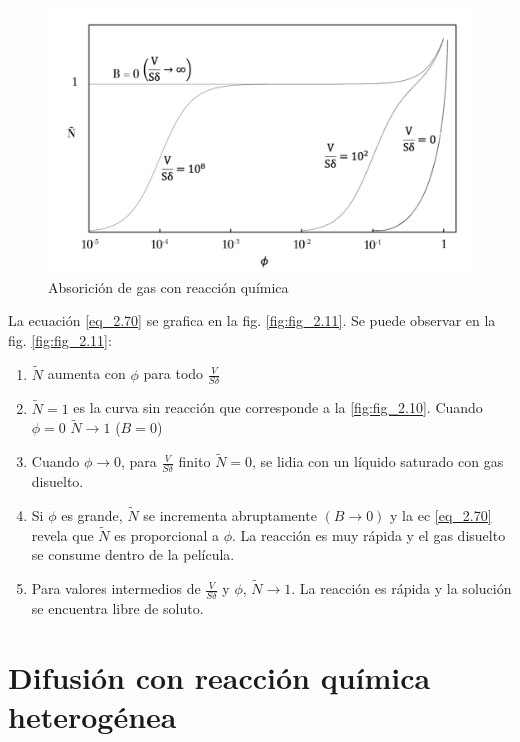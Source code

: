 \begin{figure}[H]
    \centering
    \includegraphics[width=\linewidth]{Capitulo2/Imagenes/Imagen_11_cap_2.png}
    \caption{Absorición de gas con reacción química}
    \label{fig:fig_2.11}
\end{figure}

La ecuación \eqref{eq_2.70} se grafica en la fig. \eqref{fig:fig_2.11}. Se puede observar en la fig. \eqref{fig:fig_2.11}:
\begin{enumerate}
    \item $\widetilde{N}$ aumenta con $\phi$ para todo $\frac{V}{S\delta}$
    \item $\widetilde{N}=1$ es la curva sin reacción que corresponde a la \eqref{fig:fig_2.10}. Cuando $\phi=0$ $\widetilde{N}\rightarrow1$ ($B=0$)
    \item Cuando $\phi\rightarrow0$, para $\frac{V}{S\delta}$ finito $\widetilde{N}=0$, se lidia con un líquido saturado con gas disuelto.
    \item Si $\phi$ es grande, $\widetilde{N}$ se incrementa abruptamente $(B\rightarrow 0)$ y la ec \eqref{eq_2.70} revela que $\widetilde{N}$ es proporcional a $\phi$. La reacción es muy rápida y el gas disuelto se consume dentro de la película. 
    \item Para valores intermedios de $\frac{V}{S\delta}$ y $\phi$, $\widetilde{N}\rightarrow1$. La reacción es rápida y la solución se encuentra libre de soluto. 

\end{enumerate}

\section{Difusión con reacción química heterogénea}

